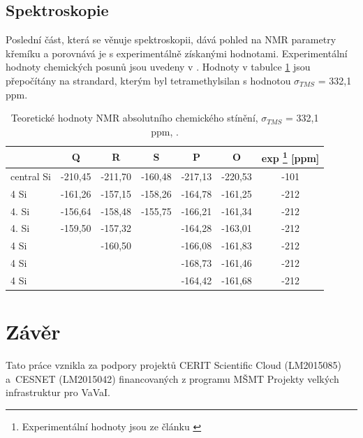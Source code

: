 \documentclass[
  digital, %
  table,   %
  lof,     %
  lot,     %
  oneside,
]{fithesis3}
\begin{document}
\section{Spektroskopie}
 Poslední část, která se věnuje spektroskopii, dává pohled na NMR parametry křemíku a porovnává je s experimentálně získanými hodnotami. Experimentální hodnoty chemických posunů jsou uvedeny v \cite{1316862}. Hodnoty v tabulce \ref{nmr} jsou přepočítány na strandard, kterým byl tetramethylsilan s hodnotou $\sigma_{TMS}$ = 332,1 ppm.

\begin{table}[htbp]
\begin{minipage}{\textwidth}
\caption{Teoretické hodnoty NMR absolutního chemického stínění, $\sigma_{TMS}$ = 332,1 ppm, \cite{1316862}.}
\begin{center}
\begin{tabular}{|l|c|c|c|c|c|c|}
\hline
\label{nmr} & \textbf{Q} & \textbf{R} &\textbf{S} & \textbf{P} & \textbf{O} & {exp \footnote{Experimentální hodnoty jsou ze článku \cite{1316862}} [ppm]} \\ \hline
central Si & -210,45 & -211,70 & -160,48 & -217,13 & -220,53 & -101 \\ \hline
4 Si & -161,26 & -157,15 &-158,26 & -164,78 & -161,25 & -212 \\ \hline
4. Si & -156,64 & -158,48 & -155,75 & -166,21 & -161,34 & -212 \\ \hline
4. Si & -159,50 & -157,32 &  & -164,28 & -163,01 & -212 \\ \hline
4 Si &  & -160,50 &  & -166,08 & -161,83 & -212 \\ \hline
4 Si &  &  &  & -168,73 & -161,46 & -212 \\ \hline
4 Si &  &  &  & -164,42 & -161,68 & -212 \\ \hline
\end{tabular}
\end{center}
\end{minipage}
\end{table}












\chapter{Závěr}
 Tato práce vznikla za podpory projektů CERIT Scientific Cloud (LM2015085) a~CESNET (LM2015042) financovaných z programu MŠMT Projekty velkých infrastruktur pro VaVaI.
\newpage
\end{document}
